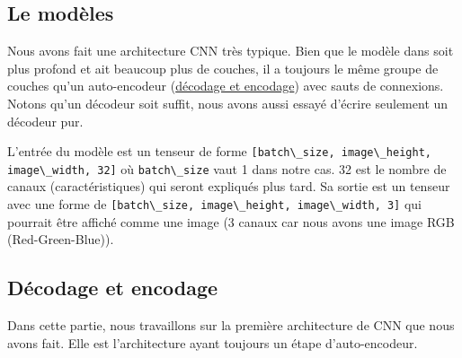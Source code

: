 \documentclass[
  11pt,
  dvipsnames]{article}
\newcommand{\passthrough}[1]{#1}
\begin{document}
\hypertarget{le-moduxe8les}{%
\subsection{Le modèles}\label{le-moduxe8les}}

Nous avons fait une architecture CNN très typique. Bien que le modèle dans \autocite{1711.10925}
soit plus profond et ait beaucoup plus de couches, il a toujours le même groupe de couches
qu'un auto-encodeur (\protect\hyperlink{duxe9codage-et-encodage}{décodage et encodage}) avec sauts de connexions. Notons qu'un décodeur soit suffit, nous avons aussi essayé d'écrire seulement un décodeur pur.

L'entrée du modèle est un tenseur de forme \passthrough{\lstinline![batch\_size, image\_height, image\_width, 32]!} où \passthrough{\lstinline!batch\_size!} vaut 1 dans notre cas. 32 est le nombre de canaux (caractéristiques) qui seront expliqués plus tard. Sa sortie est un tenseur avec une forme de \passthrough{\lstinline![batch\_size, image\_height, image\_width, 3]!} qui pourrait être affiché comme une image (3 canaux car nous avons une image RGB (Red-Green-Blue)).

\hypertarget{duxe9codage-et-encodage}{%
\subsection{Décodage et encodage}\label{duxe9codage-et-encodage}}

Dans cette partie, nous travaillons sur la première architecture de CNN que nous avons fait.
Elle est l'architecture ayant toujours un étape d'auto-encodeur.
\end{document}
